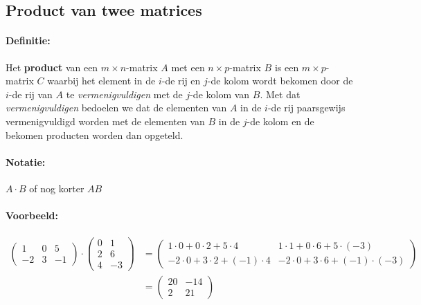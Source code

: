 \documentclass[12pt,twoside]{article}
\begin{document}
\subsection{Product van twee matrices}

\paragraph*{Definitie:} Het {\bf product} van een $m \times n$-matrix $A$ met een $n \times p$-matrix $B$ is een $m \times p$-matrix $C$ waarbij het element in de $i$-de rij en $j$-de kolom wordt bekomen door de $i$-de rij van $A$ te {\em vermenigvuldigen} met de $j$-de kolom van $B$. Met dat {\em vermenigvuldigen} bedoelen we dat de elementen van $A$ in de $i$-de rij paarsgewijs vermenigvuldigd worden met de elementen van $B$ in de $j$-de kolom en de bekomen producten worden dan opgeteld.

\paragraph*{Notatie:} $A \cdot B$ of nog korter $AB$

\paragraph*{Voorbeeld:}
\begin{align*}
  \begin{pmatrix}
    1 & 0 & 5\\
    -2 & 3 & -1
  \end{pmatrix}
    \cdot
  \begin{pmatrix}
    0 & 1\\
    2 & 6\\
    4 & -3
  \end{pmatrix}
    &=
  \begin{pmatrix}
    1 \cdot 0 + 0 \cdot 2 + 5 \cdot 4    & 1 \cdot 1 + 0 \cdot 6 + 5 \cdot (-3)\\
    -2 \cdot 0 + 3 \cdot 2 + (-1)\cdot 4 & -2 \cdot 0 + 3 \cdot 6 + (-1) \cdot (-3)
  \end{pmatrix}\\
    &=
  \begin{pmatrix}
    20 & -14\\
    2  & 21
  \end{pmatrix}
\end{align*}
\end{document}
